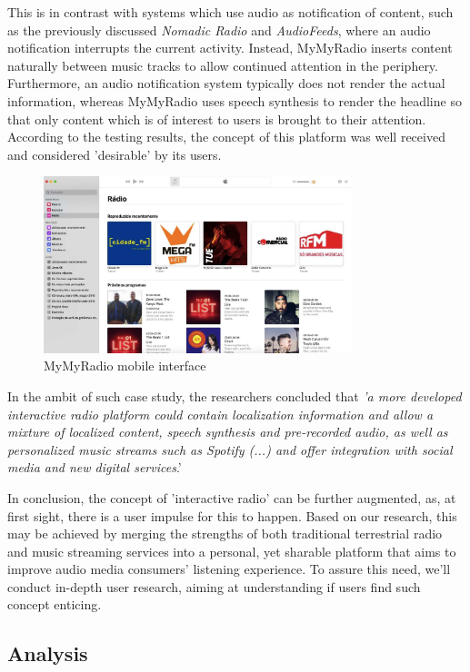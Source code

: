 This is in contrast with systems which use audio as notification of content, such as the previously discussed \textit{Nomadic Radio} and \textit{AudioFeeds}, where an audio notification interrupts the current activity. Instead, MyMyRadio inserts content naturally between music tracks to allow continued attention in the periphery. Furthermore, an audio notification system typically does not render the actual information, whereas MyMyRadio uses speech synthesis to render the headline so that only content which is of interest to users is brought to their attention. According to the testing results, the concept of this platform was well received and considered 'desirable' by its users.

\begin{figure}[h]
\centering
\includegraphics[width=0.8\textwidth]{./Images/applemusic.png}
\caption{MyMyRadio mobile interface}
\label{fig:test_env}
\end{figure}

In the ambit of such case study, the researchers concluded that \textit{'a more developed interactive radio platform could contain localization information and allow a mixture of localized content, speech synthesis and pre-recorded audio, as well as personalized music streams such as Spotify (...) and offer integration with social media and new digital services}.'

In conclusion, the concept of 'interactive radio' can be further augmented, as, at first sight, there is a user impulse for this to happen. Based on our research, this may be achieved by merging the strengths of both traditional terrestrial radio and music streaming services into a personal, yet sharable platform that aims to improve audio media consumers' listening experience. To assure this need, we'll conduct in-depth user research, aiming at understanding if users find such concept enticing.

\subsection{Analysis}



